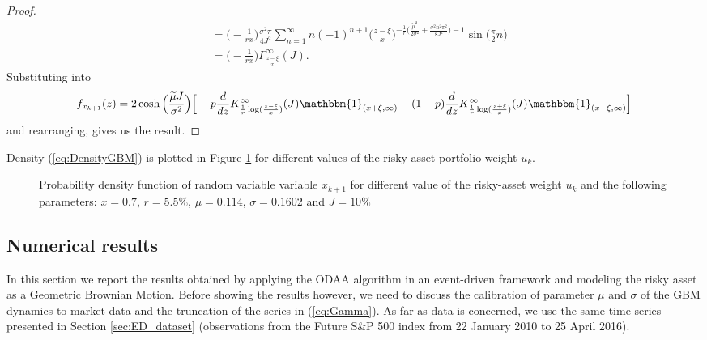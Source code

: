 \begin{proof}
\begin{align*}
	& = \big(-\frac{1}{rx}\big)\frac{\sigma^2\pi}{4J^2}\sum_{n=1}^{\infty}n(-1)^{n+1} \Big(\frac{z-\xi}{x}\Big)^{-\frac{1}{r}\big(\frac{\tilde{\mu}^2}{2\sigma^2} + \frac{\sigma^2n^2\pi^2}{8J^2}\big)-1}\sin\big(\frac{\pi}{2}n\big)\\[2ex]
	& = \big(-\frac{1}{rx}\big)\Gamma_{\frac{z-\xi}{x}}^{\infty}(J).
	\end{align*}
	Substituting into
	\[
	f_{x_{k+1}}(z) =2\cosh\Big(\frac{\widetilde{\mu}J}{\sigma^2}\Big)\Big[-p\frac{d}{dz}K_{\frac{1}{r}\log(\frac{z-\xi}{x})}^{\infty}(J)\mathbbm{1}_{(x+\xi,\infty)}-(1-p)\frac{d}{dz}K_{\frac{1}{r}\log(\frac{z+\xi}{x})}^{\infty}(J)\mathbbm{1}_{(x-\xi,\infty)}\Big]
	\]
	and rearranging, gives us the result.
\end{proof}
Density (\ref{eq:DensityGBM}) is plotted in Figure \ref{fig:PtfDensity} for different values of the risky asset portfolio weight $u_k$.
\begin{figure}[]
	\caption{Probability density function of random variable variable $x_{k+1}$ for different value of the risky-asset weight $u_k$ and the following parameters: $x=0.7$, $r=5.5\%$, $\mu=0.114$, $\sigma=0.1602$ and $J=10\%$}
	\label{fig:PtfDensity}
\end{figure}

\subsection{Numerical results}
In this section we report the results obtained by applying the \gls{ODAA} algorithm in an event-driven framework and modeling the risky asset as a Geometric Brownian Motion. Before showing the results however, we need to discuss the calibration of parameter $\mu$ and $\sigma$ of the \gls{GBM} dynamics to market data and the truncation of the series in (\ref{eq:Gamma}). As far as data is concerned, we use the same time series presented in Section \ref{sec:ED_dataset} (observations from the Future S\&P 500 index from 22 January 2010 to 25 April 2016).
